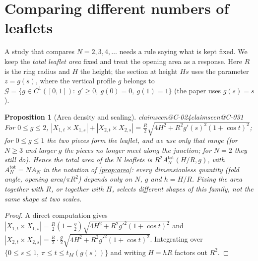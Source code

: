 \documentclass[11pt,a4paper]{article}
\makeatletter
\theoremstyle{plain}
\newtheorem{proposition}[theorem]{Proposition}
\theoremstyle{remark}
\newcommand{\claim}[1]{\ifcsname claimseen@#1\endcsname\else\expandafter\gdef\csname claimseen@#1\endcsname{}\label{claim:#1}\fi}
\makeatother
\begin{document}
\section{Comparing different numbers of leaflets}\label{sec:compare}

A study that compares $N=2,3,4,\dots$ needs a rule saying what is kept fixed. We keep the \emph{total leaflet area} fixed
and treat the opening area as a response. Here $R$ is the ring radius and $H$ the height; the section at height $Hs$ uses
the parameter $z=g(s)$, where the vertical profile $g$ belongs to
$\mathcal G=\{g\in C^1([0,1]):\ g'\ge0,\ g(0)=0,\ g(1)=1\}$ (the paper uses $g(s)=s$).

\begin{proposition}[Area density and scaling]\label{prop:scaling}\claim{C-024}\claim{C-031}
For $0\le g\le 2$, $|X_{1,t}\times X_{1,s}|+|X_{2,t}\times X_{2,s}|=\tfrac R2\sqrt{4H^2+R^2g'(s)^2(1+\cos t)^2}$; for
$0\le g\le1$ the two pieces form the leaflet, and we use only that range (for $N\ge3$ and larger $g$ the pieces no longer
meet along the junction; for $N=2$ they still do). Hence the total area of the $N$ leaflets is
$R^2 A^{\mathrm{tot}}_N(H/R,g)$, with $A^{\mathrm{tot}}_N=N A_N$ in the notation of \cref{prop:area}: every dimensionless
quantity (fold angle, opening area$/\pi R^2$) depends only on $N$, $g$ and $h=H/R$. Fixing the area together with $R$, or
together with $H$, selects \emph{different} shapes of this family, not the same shape at two scales.
\end{proposition}
\begin{proof}
A direct computation gives $|X_{1,t}\times X_{1,s}|=\frac R2(1-\frac g2)\sqrt{4H^2+R^2g'^2(1+\cos t)^2}$ and
$|X_{2,t}\times X_{2,s}|=\frac R2\cdot\frac g2\sqrt{4H^2+R^2g'^2(1+\cos t)^2}$. Integrating over
$\{0\le s\le1,\ \pi\le t\le t_M(g(s))\}$ and writing $H=hR$ factors out $R^2$.
\end{proof}
\end{document}
